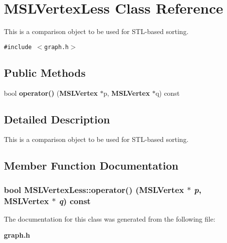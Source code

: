 \section{MSLVertex\-Less  Class Reference}
\label{classMSLVertexLess}
This is a comparison object to be used for STL-based sorting. 


{\tt \#include $<$graph.h$>$}

\subsection*{Public Methods}
\begin{CompactItemize}
\item 
bool {\bf operator()} ({\bf MSLVertex} $\ast$p, {\bf MSLVertex} $\ast$q) const
\end{CompactItemize}


\subsection{Detailed Description}
This is a comparison object to be used for STL-based sorting.



\subsection{Member Function Documentation}
\subsubsection{\setlength{\rightskip}{0pt plus 5cm}bool MSLVertex\-Less::operator() ({\bf MSLVertex} $\ast$ {\em p}, {\bf MSLVertex} $\ast$ {\em q}) const\hspace{0.3cm}{\tt  [inline]}}\label{classMSLVertexLess_a0}




The documentation for this class was generated from the following file:\begin{CompactItemize}
\item 
{\bf graph.h}\end{CompactItemize}
